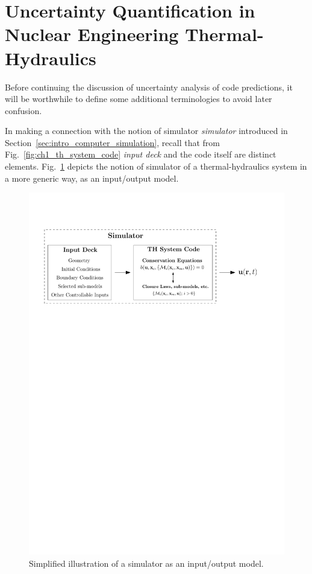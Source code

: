 \section{Uncertainty Quantification in Nuclear Engineering Thermal-Hydraulics}\label{sec:intro_uncertainty_quantification}

Before continuing the discussion of uncertainty analysis of code predictions, it will be worthwhile to define some additional terminologies to avoid later confusion.

In making a connection with the notion of simulator \emph{simulator} introduced in Section~\ref{sec:intro_computer_simulation}, 
recall that from Fig.~\ref{fig:ch1_th_system_code} \emph{input deck} and the code itself are distinct elements.
Fig.~\ref{fig:ch1_simulator_io} depicts the notion of simulator of a thermal-hydraulics system in a more generic way, as an input/output model.
\begin{figure}[bth]	
	\centering
	\includegraphics[width=\textwidth]{../figures/chapter1/figures/simulator_io}
	\caption[Simplified illustration of a simulator as an input/output model]{Simplified illustration of a simulator as an input/output model.}
	\label{fig:ch1_simulator_io}
\end{figure}

